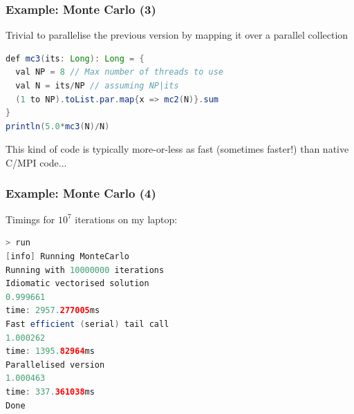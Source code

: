 \documentclass[mathserif,handout]{beamer}
\begin{document}
\begin{frame}[fragile]
\frametitle{Example: Monte Carlo (3)}
Trivial to parallelise the previous version by mapping it over a parallel collection
{\small
\begin{lstlisting}[language=java]
def mc3(its: Long): Long = {
  val NP = 8 // Max number of threads to use
  val N = its/NP // assuming NP|its
  (1 to NP).toList.par.map{x => mc2(N)}.sum
}
println(5.0*mc3(N)/N)
\end{lstlisting}}
This kind of code is typically more-or-less as fast (sometimes faster!) than native C/MPI code...
\end{frame}

\begin{frame}[fragile]
\frametitle{Example: Monte Carlo (4)}
Timings for $10^7$ iterations on my laptop:
{\small
\begin{lstlisting}[language=java]
> run
[info] Running MonteCarlo 
Running with 10000000 iterations
Idiomatic vectorised solution
0.999661
time: 2957.277005ms
Fast efficient (serial) tail call
1.000262
time: 1395.82964ms
Parallelised version
1.000463
time: 337.361038ms
Done
\end{lstlisting}}
\end{frame}
\end{document}
